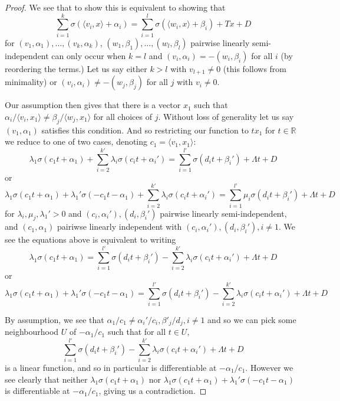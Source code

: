\documentclass[11pt,letterpaper]{amsart}
\begin{document}
\begin{proof}
    \par We see that to show this is equivalent to showing that
    $$
    \sum_{i=1}^k \sigma (\langle v_i, x\rangle + \alpha_i) = \sum_{i=1}^l \sigma (\langle w_i, x\rangle + \beta_i) + Tx+D
    $$
    for $(v_1, \alpha_1), \ldots, (v_k, \alpha_k)$, $(w_1, \beta_1), \ldots, (w_l, \beta_l)$ pairwise linearly semi-independent can only occur when $k=l$ and $(v_i, \alpha_i) = -(w_i, \beta_i)$ for all $i$ (by reordering the terms.) Let us say either $k> l$ with $v_{l+1}\neq 0$ (this follows from minimality) or $(v_i, \alpha_i) \neq -(w_j, \beta_j)$ for all $j$ with $v_i\neq 0$. 
    \par Our assumption then gives that there is a vector $x_1$ such that $\alpha_i/\langle v_i, x_1\rangle\neq \beta_j/\langle w_j, x_1\rangle$ for all choices of $j$. Without loss of generality let us say $(v_1, \alpha_1)$ satisfies this condition. And so restricting our function to $tx_1$ for $t\in\mathbb{R}$ we reduce to one of two cases, denoting $c_1=\langle v_1, x_1\rangle$:
    $$
    \lambda_1 \sigma (c_1 t + \alpha_1) + \sum_{i=2}^{k'} \lambda_i\sigma (c_i t + \alpha_i') = \sum_{i=1}^{l'}\sigma(d_i t + \beta_i') + \Lambda t + D
    $$
    or
    $$
    \lambda_1 \sigma (c_1 t + \alpha_1) + \lambda_1' \sigma(-c_1 t - \alpha_1) + \sum_{i=2}^{k'} \lambda_i\sigma (c_i t + \alpha_i') = \sum_{i=1}^{l'}\mu_i\sigma(d_i t + \beta_i') + \Lambda t + D
    $$
    for $\lambda_i, \mu_j, \lambda_1'>0$ and $(c_i, \alpha_i'), (d_i, \beta_i')$ pairwise linearly semi-independent, and $(c_1, \alpha_1)$ pairiwse linearly independent with $(c_i, \alpha_i'), (d_i, \beta_i'), i\neq 1$. We see the equations above is equivalent to writing
    $$
    \lambda_1 \sigma (c_1 t + \alpha_1) = \sum_{i=1}^{l'}\sigma(d_i t + \beta_i') - \sum_{i=2}^{k'} \lambda_i\sigma (c_i t + \alpha_i') + \Lambda t + D
    $$
    or
    $$
    \lambda_1 \sigma (c_1 t + \alpha_1) + \lambda_1' \sigma(-c_1 t - \alpha_1) = \sum_{i=1}^{l'}\sigma(d_i t + \beta_i') - \sum_{i=2}^{k'} \lambda_i\sigma (c_i t + \alpha_i') + \Lambda t + D
    $$
    \par By assumption, we see that $\alpha_1/c_1\neq \alpha_i'/c_i, \beta'_j/d_j, i\neq 1$ and so we can pick some neighbourhood $U$ of $-\alpha_1/c_1$ such that for all $t\in U$,
    $$
    \sum_{i=1}^{l'}\sigma(d_i t + \beta_i') - \sum_{i=2}^{k'} \lambda_i\sigma (c_i t + \alpha_i') + \Lambda t + D
    $$
     is a linear function, and so in particular is differentiable at $-\alpha_1/c_1$. However we see clearly that neither $\lambda_1 \sigma (c_1 t + \alpha_1)$ nor $\lambda_1 \sigma (c_1 t + \alpha_1) + \lambda_1' \sigma(-c_1 t - \alpha_1)$ is differentiable at $-\alpha_1/c_1$, giving us a contradiction. 
\end{proof}
\end{document}
